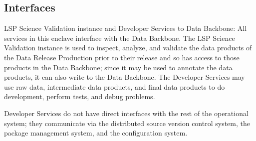 \documentclass[DM,toc]{lsstdoc}
\begin{document}
\subsection{Interfaces}\label{ncsa-development-integration-interfaces}

LSP Science Validation instance and Developer Services to Data Backbone:
All services in this enclave interface with the Data Backbone.  The LSP
Science Validation instance is used to inspect, analyze, and validate the data
products of the Data Release Production prior to their release and so has
access to those products in the Data Backbone; since it may be used to annotate
the data products, it can also write to the Data Backbone.  The Developer
Services may use raw data, intermediate data products, and final
data products to do development, perform tests, and debug problems.

Developer Services do not have direct interfaces with the rest of the
operational system; they communicate via the distributed source version control
system, the package management system, and the configuration system.







\end{document}
